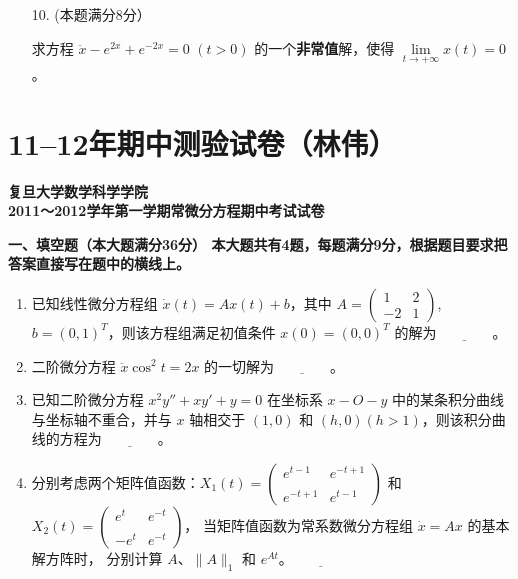 \begin{enumerate}
(3)
若 (2) 中得到的矩阵 $\boldsymbol{C}$ 的一切特征值实部都小于 $0$，
设 $\boldsymbol{H}(t)$ 为 $\mathbb{R}$ 上的 $n$ 阶\textbf{有界}连续矩阵值函数，
证明存在 $\varepsilon_0 > 0$，当 $0 < \varepsilon < \varepsilon_0$ 时，
方程 $\dot{\boldsymbol{x}} = [\boldsymbol{A}(t) + \varepsilon \boldsymbol{H}(t)]\boldsymbol{x}$ 
的一切解在 $t \to +\infty$ 时趋于 $\boldsymbol{0}$。


\item[10.] (本题满分8分）

求方程 $\ddot{x} - e^{2x} + e^{-2x} = 0$ $(t>0)$ 的一个\textbf{非常值}解，使得
$\lim\limits_{t \to +\infty} x(t) = 0$。
\end{enumerate}
\section{11--12年期中测验试卷（林伟）}

\textbf{复旦大学数学科学学院\\
2011～2012学年第一学期常微分方程期中考试试卷}

\textbf{一、填空题（本大题满分36分）
本大题共有4题，每题满分9分，根据题目要求把答案直接写在题中的横线上。}

\begin{enumerate}[label=\arabic*.]
    \item 已知线性微分方程组 $\dot{x}(t) = Ax(t) + b$，其中 $A = \begin{pmatrix} 1 & 2 \\ -2 & 1 \end{pmatrix}$, $b = (0, 1)^T$，则该方程组满足初值条件 $x(0) = (0, 0)^T$ 的解为$\underline{\qquad\qquad}$。
    
    \item 二阶微分方程 $\ddot{x} \cos^2 t = 2x$ 的一切解为$\underline{\qquad\qquad}$。
    
    \item 已知二阶微分方程 $x^2y'' + xy' + y = 0$ 在坐标系 $x - O - y$ 中的某条积分曲线与坐标轴不重合，并与 $x$ 轴相交于 $(1, 0)$ 和 $(h, 0)(h > 1)$，则该积分曲线的方程为$\underline{\qquad\qquad}$。
    
    \item 分别考虑两个矩阵值函数：$X_1(t) = \begin{pmatrix} e^{t-1} & e^{-t+1} \\ \\ e^{-t+1} & e^{t-1} \end{pmatrix}$ 
    和 $X_2(t) = \begin{pmatrix} e^t & e^{-t} \\ \\ -e^t & e^{-t} \end{pmatrix}$，
    当矩阵值函数为常系数微分方程组 $\dot{x} = Ax$ 的基本解方阵时，
    分别计算 $A$、$\|A\|_1$ 和 $e^{At}$。$\underline{\qquad\qquad}$
\end{enumerate}


